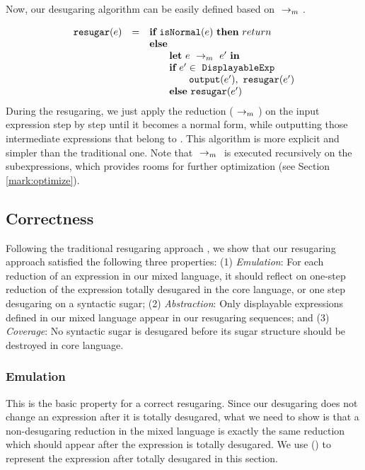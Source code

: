 
Now, our desugaring algorithm can be easily defined based on $~\rightarrow_m~$.

\[
\begin{array}{llll}
\mbox{\tt resugar} (e) &=& \mbox{\rm \bf if}~\mbox{\tt isNormal}(e)~\mbox{\rm \bf then}~return\\
              & & \mbox{\rm \bf else}~\\
							& & \qquad \mbox{\rm \bf let}~e ~\rightarrow_m~e'~\mbox{\rm \bf in}\\
							& & \qquad \mbox{\rm \bf if}~e' \in~\mbox{\tt DisplayableExp} \\
							& & \qquad \qquad \mbox{\tt output}(e'),~\mbox{\tt resugar}(e')\\
							& & \qquad \mbox{\rm \bf else}~\mbox{\tt resugar}(e')
\end{array}
\]
During the resugaring, we just apply the reduction ($~\rightarrow_m~$) on the input expression step by step until it becomes a normal form, while outputting those intermediate expressions that belong to . This algorithm is more explicit and simpler than the traditional one. Note that $~\rightarrow_m~$ is executed recursively on the subexpressions, which provides rooms for further optimization (see Section \ref{mark:optimize}).

\subsection{Correctness}
\label{mark:correct}

Following the traditional resugaring approach \cite{resugaring,hygienic}, we show that our resugaring approach satisfied the following three properties:
(1)
\emph{Emulation}: For each reduction of an expression in our mixed language, it should reflect on one-step reduction of the expression totally desugared in the core language, or one step desugaring on a syntactic sugar;
(2)
\emph{Abstraction}: Only displayable expressions defined in our mixed language appear in our resugaring sequences; and
(3)
\emph{Coverage}: No syntactic sugar is desugared before its sugar structure should be destroyed in core language.

\subsubsection{Emulation} This is the basic property for a correct resugaring. Since our desugaring does not change an expression after it is totally desugared, what we need to show is that a non-desugaring reduction in the mixed language is exactly the same  reduction which should appear after the expression is totally desugared. We use () to represent the expression after  totally desugared in this section.

